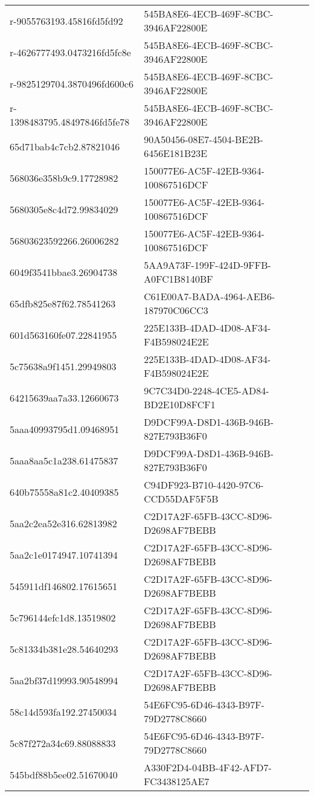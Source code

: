 \begin{tabular}{ll}
r-9055763193.45816fd5fd92 & 545BA8E6-4ECB-469F-8CBC-3946AF22800E \\
r-4626777493.0473216fd5fc8e & 545BA8E6-4ECB-469F-8CBC-3946AF22800E \\
r-9825129704.3870496fd600c6 & 545BA8E6-4ECB-469F-8CBC-3946AF22800E \\
r-1398483795.48497846fd5fe78 & 545BA8E6-4ECB-469F-8CBC-3946AF22800E \\
65d71bab4c7cb2.87821046 & 90A50456-08E7-4504-BE2B-6456E181B23E \\
568036e358b9c9.17728982 & 150077E6-AC5F-42EB-9364-100867516DCF \\
5680305e8c4d72.99834029 & 150077E6-AC5F-42EB-9364-100867516DCF \\
56803623592266.26006282 & 150077E6-AC5F-42EB-9364-100867516DCF \\
6049f3541bbae3.26904738 & 5AA9A73F-199F-424D-9FFB-A0FC1B8140BF \\
65dfb825e87f62.78541263 & C61E00A7-BADA-4964-AEB6-187970C06CC3 \\
601d563160fe07.22841955 & 225E133B-4DAD-4D08-AF34-F4B598024E2E \\
5c75638a9f1451.29949803 & 225E133B-4DAD-4D08-AF34-F4B598024E2E \\
64215639aa7a33.12660673 & 9C7C34D0-2248-4CE5-AD84-BD2E10D8FCF1 \\
5aaa40993795d1.09468951 & D9DCF99A-D8D1-436B-946B-827E793B36F0 \\
5aaa8aa5c1a238.61475837 & D9DCF99A-D8D1-436B-946B-827E793B36F0 \\
640b75558a81c2.40409385 & C94DF923-B710-4420-97C6-CCD55DAF5F5B \\
5aa2c2ea52e316.62813982 & C2D17A2F-65FB-43CC-8D96-D2698AF7BEBB \\
5aa2c1e0174947.10741394 & C2D17A2F-65FB-43CC-8D96-D2698AF7BEBB \\
545911df146802.17615651 & C2D17A2F-65FB-43CC-8D96-D2698AF7BEBB \\
5c796144efc1d8.13519802 & C2D17A2F-65FB-43CC-8D96-D2698AF7BEBB \\
5c81334b381e28.54640293 & C2D17A2F-65FB-43CC-8D96-D2698AF7BEBB \\
5aa2bf37d19993.90548994 & C2D17A2F-65FB-43CC-8D96-D2698AF7BEBB \\
58c14d593fa192.27450034 & 54E6FC95-6D46-4343-B97F-79D2778C8660 \\
5c87f272a34c69.88088833 & 54E6FC95-6D46-4343-B97F-79D2778C8660 \\
545bdf88b5ee02.51670040 & A330F2D4-04BB-4F42-AFD7-FC3438125AE7 \\

\end{tabular}
